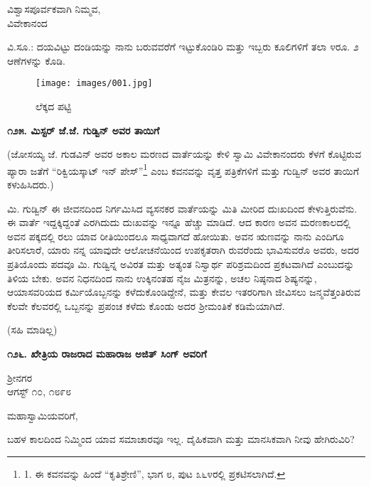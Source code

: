 \begin{flushright}
ವಿಶ್ವಾಸಪೂರ್ವಕವಾಗಿ ನಿಮ್ಮವ,\\ವಿವೇಕಾನಂದ
\end{flushright}

ವಿ.ಸೂ.: ದಯವಿಟ್ಟು ದಂಡಿಯನ್ನು ನಾನು ಬರುವವರೆಗೆ ಇಟ್ಟುಕೊಂಡಿರಿ ಮತ್ತು ಇಬ್ಬರು ಕೂಲಿಗಳಿಗೆ ತಲಾ ೪ರೂ. ೨ ಆಣೆಗಳನ್ನು ಕೊಡಿ.

\begin{figure}
\texttt{[image: images/001.jpg]}
\caption{ಲೆಕ್ಕದ ಪಟ್ಟಿ }
\end{figure}

\begin{center}
\textbf{೧೨೫. ಮಿಸ್ಟರ್ ಜೆ.ಜೆ. ಗುಡ್ವಿನ್ ಅವರ ತಾಯಿಗೆ}
\end{center}

\begin{flushright}
(ಜೋಸಯ್ಯ ಜೆ. ಗುಡವಿನ್ ಅವರ ಅಕಾಲ ಮರಣದ ವಾರ್ತೆಯನ್ನು ಕೇಳಿ ಸ್ವಾಮಿ ವಿವೇಕಾನಂದರು ಕೆಳಗೆ ಕೊಟ್ಟಿರುವ ಪ್ಯಾರಾ ಜತೆಗೆ “ರಿಕ್ವಿಯಸ್ಕಾಟ್ ಇನ್ ಪೇಸ್”\footnote{1. ಈ ಕವನವನ್ನು ಹಿಂದೆ “ಕೃತಿಶ್ರೇಣಿ”, ಭಾಗ ೮, ಪುಟ ೩೬೪ರಲ್ಲಿ ಪ್ರಕಟಿಸಲಾಗಿದೆ.} ಎಂಬ ಕವನವನ್ನು ವೃತ್ತ ಪತ್ರಿಕೆಗಳಿಗೆ ಮತ್ತು ಗುಡ್ವಿನ್ ಅವರ ತಾಯಿಗೆ ಕಳುಹಿಸಿದರು.)
\end{flushright}

ಮಿ. ಗುಡ್ವಿನ್ ಈ ಜೀವನದಿಂದ ನಿರ್ಗಮಿಸಿದ ವ್ಯಸನಕರ ವಾರ್ತೆಯನ್ನು ಮಿತಿ ಮೀರಿದ ದುಃಖದಿಂದ ಕೇಳುತ್ತಿರುವೆನು. ಈ ವಾರ್ತೆ ಇದ್ದಕ್ಕಿದ್ದಂತೆ ಎರಗಿದುದು ದುಃಖವನ್ನು ಇನ್ನೂ ಹೆಚ್ಚು ಮಾಡಿದೆ. ಆದ ಕಾರಣ ಅವನ ಮರಣಕಾಲದಲ್ಲಿ ಅವನ ಪಕ್ಕದಲ್ಲಿ ರಲು ಯಾವ ರೀತಿಯಿಂದಲೂ ಸಾಧ್ಯವಾಗದೆ ಹೋಯಿತು. ಅವನ ಋಣವನ್ನು ನಾನು ಎಂದಿಗೂ ತೀರಿಸಲಾರೆ, ಯಾರು ನನ್ನ ಯಾವುದೇ ಆಲೋಚನೆಯಿಂದ ಉಪಕೃತರಾಗಿ ರುವರೆಂದು ಭಾವಿಸುವರೊ ಅವರು, ಅದರ ಪ್ರತಿಯೊಂದು ಪದವೂ ಮಿ. ಗುಡ್ವಿನ್ನ ಅವಿರತ ಮತ್ತು ಅತ್ಯಂತ ನಿಸ್ವಾರ್ಥ ಪರಿಶ್ರಮದಿಂದ ಪ್ರಕಟವಾಗಿದೆ ಎಂಬುದನ್ನು ತಿಳಿಯ ಬೇಕು. ಅವನ ನಿಧನದಿಂದ ನಾನು ಉಕ್ಕಿನಂತಹ ನೈಜ ಮಿತ್ರನನ್ನು, ಅಚಲ ನಿಷ್ಠನಾದ ಶಿಷ್ಯನನ್ನು, ಆಯಾಸವರಿಯದ ಕರ್ಮಿಯೊಬ್ಬನನ್ನು ಕಳೆದುಕೊಂಡಿದ್ದೇನೆ, ಮತ್ತು ಕೇವಲ ಇತರರಿಗಾಗಿ ಜೀವಿಸಲು ಜನ್ಮವೆತ್ತಂತಿರುವ ಕೆಲವೇ ಕೆಲವರಲ್ಲಿ ಒಬ್ಬನನ್ನು ಪ್ರಪಂಚ ಕಳೆದು ಕೊಂಡು ಅದರ ಶ‍್ರೀಮಂತಿಕೆ ಕಡಿಮೆಯಾಗಿದೆ.

\begin{flushright}
(ಸಹಿ ಮಾಡಿಲ್ಲ)
\end{flushright}

\begin{center}
\textbf{೧೨೬. ಖೇತ್ರಿಯ ರಾಜರಾದ ಮಹಾರಾಜ ಅಜಿತ್ ಸಿಂಗ್ ಅವರಿಗೆ}
\end{center}

\begin{flushright}
ಶ‍್ರೀನಗರ\\ಆಗಸ್ಟ್ ೧೦, ೧೮೯೮
\end{flushright}

ಮಹಾಸ್ವಾಮಿಯವರಿಗೆ,

ಬಹಳ ಕಾಲದಿಂದ ನಿಮ್ಮಿಂದ ಯಾವ ಸಮಾಚಾರವೂ ಇಲ್ಲ. ದೈಹಿಕವಾಗಿ ಮತ್ತು ಮಾನಸಿಕವಾಗಿ ನೀವು ಹೇಗಿರುವಿರಿ?

